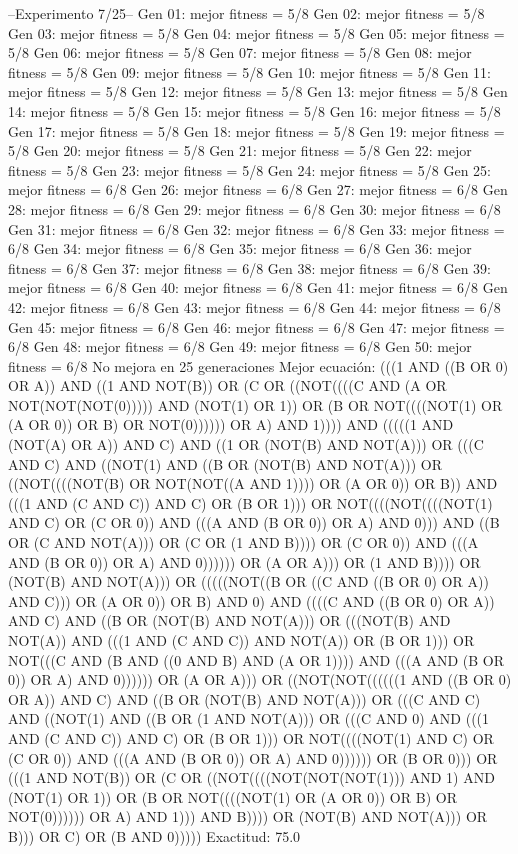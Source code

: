 --Experimento 
 7/25--
Gen 01: mejor fitness = 5/8
Gen 02: mejor fitness = 5/8
Gen 03: mejor fitness = 5/8
Gen 04: mejor fitness = 5/8
Gen 05: mejor fitness = 5/8
Gen 06: mejor fitness = 5/8
Gen 07: mejor fitness = 5/8
Gen 08: mejor fitness = 5/8
Gen 09: mejor fitness = 5/8
Gen 10: mejor fitness = 5/8
Gen 11: mejor fitness = 5/8
Gen 12: mejor fitness = 5/8
Gen 13: mejor fitness = 5/8
Gen 14: mejor fitness = 5/8
Gen 15: mejor fitness = 5/8
Gen 16: mejor fitness = 5/8
Gen 17: mejor fitness = 5/8
Gen 18: mejor fitness = 5/8
Gen 19: mejor fitness = 5/8
Gen 20: mejor fitness = 5/8
Gen 21: mejor fitness = 5/8
Gen 22: mejor fitness = 5/8
Gen 23: mejor fitness = 5/8
Gen 24: mejor fitness = 5/8
Gen 25: mejor fitness = 6/8
Gen 26: mejor fitness = 6/8
Gen 27: mejor fitness = 6/8
Gen 28: mejor fitness = 6/8
Gen 29: mejor fitness = 6/8
Gen 30: mejor fitness = 6/8
Gen 31: mejor fitness = 6/8
Gen 32: mejor fitness = 6/8
Gen 33: mejor fitness = 6/8
Gen 34: mejor fitness = 6/8
Gen 35: mejor fitness = 6/8
Gen 36: mejor fitness = 6/8
Gen 37: mejor fitness = 6/8
Gen 38: mejor fitness = 6/8
Gen 39: mejor fitness = 6/8
Gen 40: mejor fitness = 6/8
Gen 41: mejor fitness = 6/8
Gen 42: mejor fitness = 6/8
Gen 43: mejor fitness = 6/8
Gen 44: mejor fitness = 6/8
Gen 45: mejor fitness = 6/8
Gen 46: mejor fitness = 6/8
Gen 47: mejor fitness = 6/8
Gen 48: mejor fitness = 6/8
Gen 49: mejor fitness = 6/8
Gen 50: mejor fitness = 6/8
No mejora en 25 generaciones
Mejor ecuación: (((1 AND ((B OR 0) OR A)) AND ((1 AND NOT(B)) OR (C OR ((NOT((((C AND (A OR NOT(NOT(NOT(0))))) AND (NOT(1) OR 1)) OR (B OR NOT((((NOT(1) OR (A OR 0)) OR B) OR NOT(0)))))) OR A) AND 1)))) AND (((((1 AND (NOT(A) OR A)) AND C) AND ((1 OR (NOT(B) AND NOT(A))) OR (((C AND C) AND ((NOT(1) AND ((B OR (NOT(B) AND NOT(A))) OR ((NOT((((NOT(B) OR NOT(NOT((A AND 1)))) OR (A OR 0)) OR B)) AND (((1 AND (C AND C)) AND C) OR (B OR 1))) OR NOT((((NOT((((NOT(1) AND C) OR (C OR 0)) AND (((A AND (B OR 0)) OR A) AND 0))) AND ((B OR (C AND NOT(A))) OR (C OR (1 AND B)))) OR (C OR 0)) AND (((A AND (B OR 0)) OR A) AND 0)))))) OR (A OR A))) OR (1 AND B)))) OR (NOT(B) AND NOT(A))) OR (((((NOT((B OR ((C AND ((B OR 0) OR A)) AND C))) OR (A OR 0)) OR B) AND 0) AND ((((C AND ((B OR 0) OR A)) AND C) AND ((B OR (NOT(B) AND NOT(A))) OR (((NOT(B) AND NOT(A)) AND (((1 AND (C AND C)) AND NOT(A)) OR (B OR 1))) OR NOT(((C AND (B AND ((0 AND B) AND (A OR 1)))) AND (((A AND (B OR 0)) OR A) AND 0)))))) OR (A OR A))) OR ((NOT(NOT((((((1 AND ((B OR 0) OR A)) AND C) AND ((B OR (NOT(B) AND NOT(A))) OR (((C AND C) AND ((NOT(1) AND ((B OR (1 AND NOT(A))) OR (((C AND 0) AND (((1 AND (C AND C)) AND C) OR (B OR 1))) OR NOT((((NOT(1) AND C) OR (C OR 0)) AND (((A AND (B OR 0)) OR A) AND 0)))))) OR (B OR 0))) OR (((1 AND NOT(B)) OR (C OR ((NOT((((NOT(NOT(NOT(1))) AND 1) AND (NOT(1) OR 1)) OR (B OR NOT((((NOT(1) OR (A OR 0)) OR B) OR NOT(0)))))) OR A) AND 1))) AND B)))) OR (NOT(B) AND NOT(A))) OR B))) OR C) OR (B AND 0)))))
 Exactitud: 75.0%

